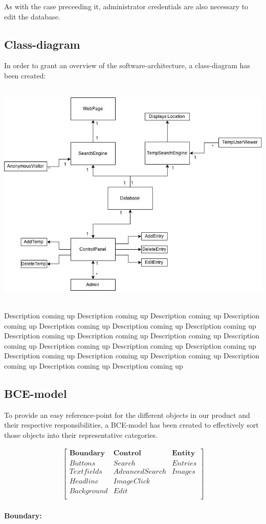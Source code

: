 \documentclass[12pt,a4paper]{article}
\begin{document}
As with the case preceeding it, administrator credentials are also necessary to edit the database.
\newpage

\subsection{Class-diagram}

In order to grant an overview of the software-architecture, a class-diagram has been created:

\includegraphics[height=110mm]{ClassDiagram.png}

Description coming up Description coming up Description coming up Description coming up Description coming up Description coming up Description coming up Description coming up Description coming up Description coming up Description coming up Description coming up Description coming up Description coming up Description coming up Description coming up Description coming up Description coming up Description coming up Description coming up 
\newpage
\subsection{BCE-model}

To provide an easy reference-point for the different objects in our product and their respective responsibilities, a BCE-model has been created to effectively sort those objects into their representative categories.

\begin{gather*}
\begin{bmatrix}
\textbf{Boundary}&\textbf{Control}&\textbf{Entity}\\
Buttons&Search&Entries\\
Textfields&Advanced Search&Images\\
Headline&ImageClick\\
Background&Edit\\
\end{bmatrix}
\end{gather*}\\
\textbf{Boundary:}\\
\end{document}

